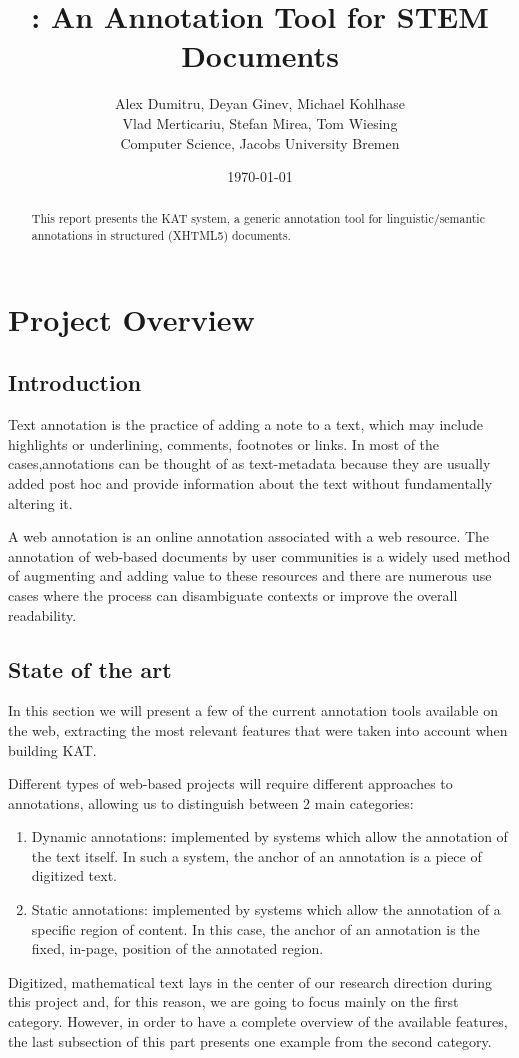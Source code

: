 \documentclass[a4paper, 12pt, notitlepage]{report}
\title{\KAT: An Annotation Tool for STEM Documents}
\author{Alex Dumitru, Deyan Ginev, Michael Kohlhase\\
  Vlad Merticariu, Stefan Mirea, Tom Wiesing\\[1ex]
Computer Science,  Jacobs University Bremen} %
\date{\today} %
\def\KAT{\textsf{KAT}\xspace}
\begin{document}
\maketitle
\begin{abstract}
  This report presents the \KAT system, a generic annotation tool for linguistic/semantic
  annotations in structured (XHTML5) documents. 
\end{abstract}

 \thispagestyle{empty} \newpage

\tableofcontents

\chapter{Project Overview}

\section{Introduction}\label{sec:intro}
Text annotation is the practice of adding a note to a text, which may include highlights
or underlining, comments, footnotes or links.  In most of the cases,annotations can be
thought of as text-metadata because they are usually added post hoc and provide
information about the text without fundamentally altering it.

A web annotation is an online annotation associated with a web resource. The annotation of
web-based documents by user communities is a widely used method of augmenting and adding
value to these resources and there are numerous use cases where the process can
disambiguate contexts or improve the overall readability.
\section{State of the art}
In this section we will present a few of the current annotation tools available on the
web, extracting the most relevant features that were taken into account when building
\KAT.

Different types of web-based projects will require different approaches to annotations,
allowing us to distinguish between 2 main categories:
\begin{enumerate}
\item Dynamic annotations: implemented by systems which allow the annotation of the text
  itself. In such a system, the anchor of an annotation is a piece of digitized text.
\item Static annotations: implemented by systems which allow the annotation of a specific
  region of content. In this case, the anchor of an annotation is the fixed, in-page,
  position of the annotated region.
\end{enumerate}
Digitized, mathematical text lays in the center of our research direction during this
project and, for this reason, we are going to focus mainly on the first category. However,
in order to have a complete overview of the available features, the last subsection of
this part presents one example from the second category.
\end{document}

